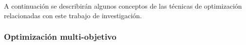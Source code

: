 A continuación se describirán algunos conceptos de las técnicas de optimización relacionadas con este trabajo de investigación. 

\subsubsection{Optimización multi-objetivo}


